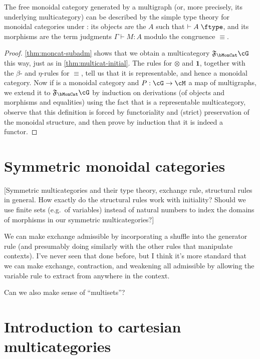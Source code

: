 \documentclass{book}
\let\types\vdash
\def\type{\;\ftype}
\newcommand{\F}[1]{\mathfrak{F}_{#1}}
\def\one{\mathbf{1}}
\let\tensor\otimes
\begin{document}
\begin{thm}\label{thm:moncat-initial}
  The free monoidal category generated by a multigraph \cG (or, more precisely, its underlying multicategory) can be described by the simple type theory for monoidal categories under \cG: its objects are the $A$ such that $\types A\type$, and its morphisms are the term judgments $\Gamma\types M:A$ modulo the congruence $\equiv$.
\end{thm}
\begin{proof}
  \cref{thm:moncat-subadm} shows that we obtain a multicategory $\F\bMonCat\cG$ this way, just as in \cref{thm:multicat-initial}.
  The rules for $\tensor$ and $\one$, together with the $\beta$- and $\eta$-rules for $\equiv$, tell us that it is representable, and hence a monoidal category.
  Now if \cM is a monoidal category and $P:\cG\to\cM$ a map of multigraphs, we extend it to $\F\bMonCat\cG$ by induction on derivations (of objects and morphisms and equalities) using the fact that \cM is a representable multicategory, observe that this definition is forced by functoriality and (strict) preservation of the monoidal structure, and then prove by induction that it is indeed a functor.
\end{proof}


\section{Symmetric monoidal categories}
\label{sec:symmoncat}

[Symmetric multicategories and their type theory, exchange rule, structural rules in general.  How exactly do the structural rules work with initiality?  Should we use finite sets (e.g.\ of variables) instead of natural numbers to index the domains of morphisms in our symmetric multicategories?]

We can make exchange admissible by incorporating a shuffle into the generator rule (and presumably doing similarly with the other rules that manipulate contexts).
I've never seen that done before, but I think it's more standard that we can make exchange, contraction, and weakening all admissible by allowing the variable rule to extract from anywhere in the context.

Can we also make sense of ``multisets''?


\section{Introduction to cartesian multicategories}
\label{sec:cartmulti}
\end{document}
